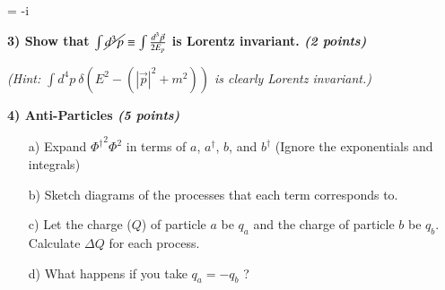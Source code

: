 {\begin{itemize}
{\be
{} = -i 
\ee
}

\end{itemize}

\vspace*{0.25in}

\textbf{3) Show that $\int \cancel{d^3p} \equiv \int \frac{d^3\vec{p}}{2E_p}$ is Lorentz invariant. \hfill \textit{(2 points)}}

\textit{ (Hint: $\int d^4p\ \delta(E^2 - (|\vec{p}|^2 + m^2))$ is clearly Lorentz invariant.)}

\vspace*{0.25in}

\textbf{4) Anti-Particles  \hfill \textit{(5 points)}}
\begin{itemize}
\item[a)] {Expand ${\Phi^\dagger}^2 \Phi^2$  in terms of $a$, $a^\dagger$, $b$, and $b^\dagger$  (Ignore the exponentials and integrals)}
\item[b)] {Sketch diagrams of the processes that each term corresponds to.}
\item[c)] {Let the charge ($Q$) of particle $a$ be $q_a$ and the charge of particle $b$ be $q_b$.  Calculate $\Delta Q$ for each process. }
\item[d)] {What happens if you take $q_a = -q_b$ ?}
\end{itemize}





}


